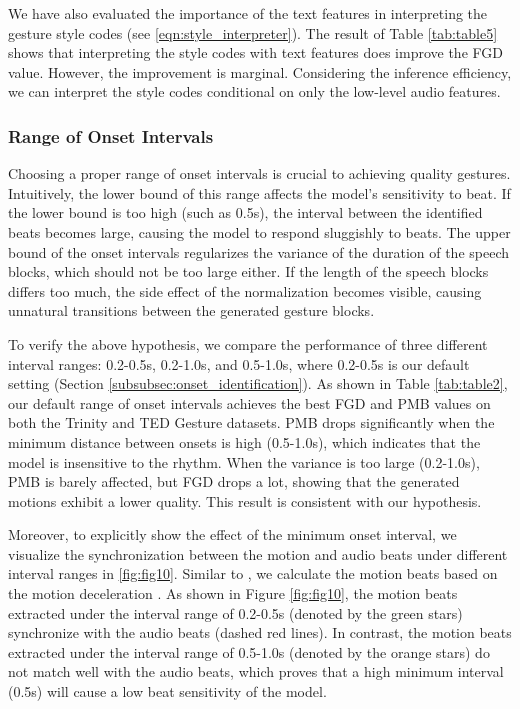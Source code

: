 We have also evaluated the importance of the text features in interpreting the gesture style codes (see \eqn\ref{eqn:style_interpreter}).
The result of Table \ref{tab:table5} shows that interpreting the style codes 
with text features does improve the FGD value. However, the improvement is marginal. Considering the inference efficiency, we can interpret the style codes conditional on only the low-level audio features.

\subsubsection{Range of Onset Intervals}
\label{subsubsec:onset_interval}
Choosing a proper range of onset intervals is crucial to achieving quality gestures. Intuitively, the lower bound of this range affects the model's sensitivity to beat. If the lower bound is too high (such as 0.5s), the interval between the identified beats becomes large, causing the model to respond sluggishly to beats. The upper bound of the onset intervals regularizes the variance of the duration of the speech blocks, which should not be too large either. If the length of the speech blocks differs too much, the side effect of the normalization becomes visible, causing unnatural transitions between the generated gesture blocks. 

To verify the above hypothesis, we compare the performance of three different interval ranges: 0.2-0.5s, 0.2-1.0s, and 0.5-1.0s, where 0.2-0.5s is our default setting (Section \ref{subsubsec:onset_identification}).
As shown in Table \ref{tab:table2}, our default range of onset intervals achieves the best FGD and PMB values on both the Trinity and TED Gesture datasets. PMB drops significantly when the minimum distance between onsets is high (0.5-1.0s), which indicates that the model is insensitive to the rhythm. When the variance is too large (0.2-1.0s), PMB is barely affected, but FGD drops a lot, showing that the generated motions exhibit a lower quality. This result is consistent with our hypothesis.

Moreover, to explicitly show the effect of the minimum onset interval, we visualize the synchronization between the motion and audio beats under different interval ranges in \fig\ref{fig:fig10}. 
Similar to \citet{aristidou2021rhythm}, we calculate the motion beats based on the motion deceleration \cite{davis2018visual}.
As shown in Figure \ref{fig:fig10}, the motion beats extracted under the interval range of 0.2-0.5s (denoted by the green stars) synchronize with the audio beats (dashed red lines). In contrast, the motion beats extracted under the interval range of 0.5-1.0s (denoted by the orange stars) do not match well with the audio beats, which proves that a high minimum interval (0.5s) will cause a low beat sensitivity of the model.

